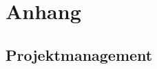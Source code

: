 %
%



\appendix
\chapter{Anhang}\label{chap.anhang}



\section{Projektmanagement}\label{projektmanagement}